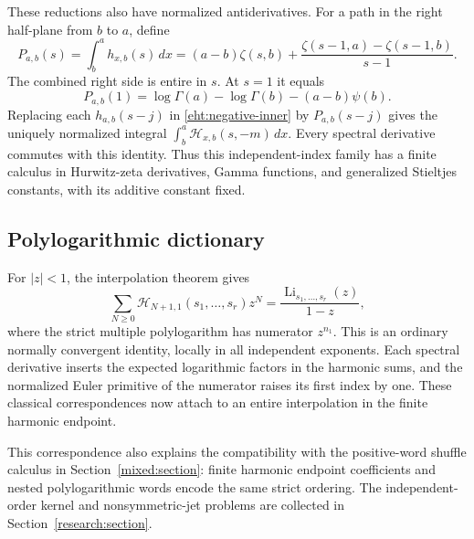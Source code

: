 These reductions also have normalized antiderivatives.  For a path in
the right half-plane from $b$ to $a$, define
\begin{equation}\label{eht:primitive}
 P_{a,b}(s)=\int_b^a h_{x,b}(s)\,dx
    =(a-b)\zeta(s,b)
     +\frac{\zeta(s-1,a)-\zeta(s-1,b)}{s-1}.
\end{equation}
The combined right side is entire in $s$.  At $s=1$ it equals
\[
 P_{a,b}(1)=\log\Gamma(a)-\log\Gamma(b)-(a-b)\psi(b).
\]
Replacing each $h_{a,b}(s-j)$ in \eqref{eht:negative-inner} by
$P_{a,b}(s-j)$ gives the uniquely normalized integral
$\int_b^a\mathcal H_{x,b}(s,-m)\,dx$.  Every spectral derivative
commutes with this identity.  Thus this independent-index family has a
finite calculus in Hurwitz-zeta derivatives, Gamma functions, and
generalized Stieltjes constants, with its additive constant fixed.

\subsection{Polylogarithmic dictionary}

For $|z|<1$, the interpolation theorem gives
\begin{equation}\label{eht:polylog}
 \sum_{N\ge0}\mathcal H_{N+1,1}(s_1,\ldots,s_r)z^N
  =\frac{\operatorname{Li}_{s_1,\ldots,s_r}(z)}{1-z},
\end{equation}
where the strict multiple polylogarithm has numerator $z^{n_1}$.
This is an ordinary normally convergent identity, locally in all
independent exponents.  Each spectral derivative inserts the expected
logarithmic factors in the harmonic sums, and the normalized Euler
primitive of the numerator raises its first index by one.  These
classical correspondences now attach to an entire interpolation in the
finite harmonic endpoint.

This correspondence also explains the compatibility with the positive-word
shuffle calculus in Section~\ref{mixed:section}: finite harmonic endpoint
coefficients and nested polylogarithmic words encode the same strict
ordering. The independent-order kernel and nonsymmetric-jet problems
are collected in Section~\ref{research:section}.
